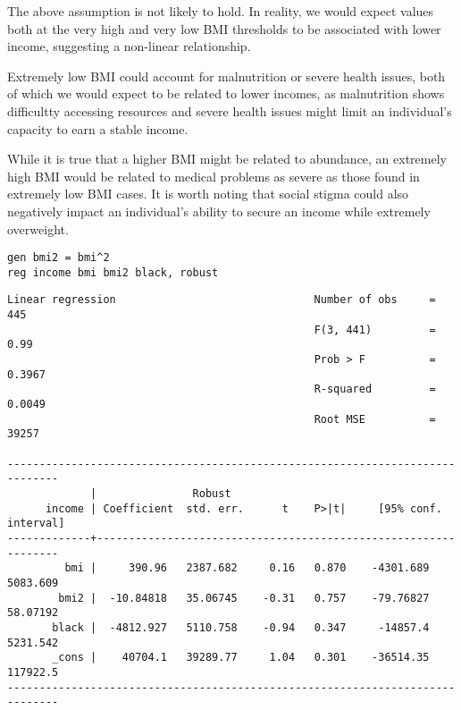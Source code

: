 


The above assumption is not likely to hold. In reality, we would expect values both at the very high and very low BMI thresholds to be associated with lower income, suggesting a non-linear relationship.

Extremely low BMI could account for malnutrition or severe health issues, both of which we would expect to be related to lower incomes, as malnutrition shows difficultty accessing resources and severe health issues might limit an individual's capacity to earn a stable income.

While it is true that a higher BMI might be related to abundance, an extremely high BMI would be related to medical problems as severe as those found in extremely low BMI cases. It is worth noting that social stigma could also negatively impact an individual's ability to secure an income while extremely overweight.


\begin{verbatim}
gen bmi2 = bmi^2
reg income bmi bmi2 black, robust    
\end{verbatim}

\begin{verbatim}
Linear regression                               Number of obs     =        445
                                                F(3, 441)         =       0.99
                                                Prob > F          =     0.3967
                                                R-squared         =     0.0049
                                                Root MSE          =      39257

------------------------------------------------------------------------------
             |               Robust
      income | Coefficient  std. err.      t    P>|t|     [95% conf. interval]
-------------+----------------------------------------------------------------
         bmi |     390.96   2387.682     0.16   0.870    -4301.689    5083.609
        bmi2 |  -10.84818   35.06745    -0.31   0.757    -79.76827    58.07192
       black |  -4812.927   5110.758    -0.94   0.347     -14857.4    5231.542
       _cons |    40704.1   39289.77     1.04   0.301    -36514.35    117922.5
------------------------------------------------------------------------------
\end{verbatim}

